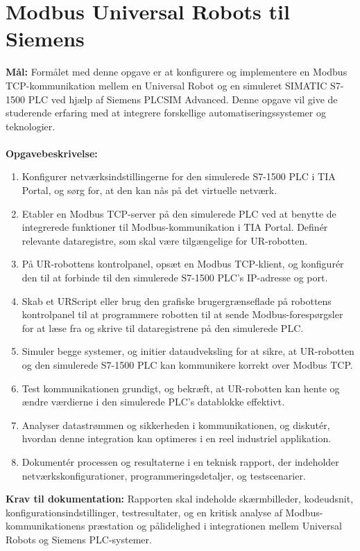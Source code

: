 \section{Modbus Universal Robots til Siemens}
\label{subsec:modbus_tcp_ur_plcsim_advanced}
\textbf{Mål:} Formålet med denne opgave er at konfigurere og implementere en Modbus TCP-kommunikation mellem en Universal Robot og en simuleret SIMATIC S7-1500 PLC ved hjælp af Siemens PLCSIM Advanced. Denne opgave vil give de studerende erfaring med at integrere forskellige automatiseringssystemer og teknologier.	
\\\\
\noindent\textbf{Opgavebeskrivelse:}
\begin{enumerate}
	\item Konfigurer netværksindstillingerne for den simulerede S7-1500 PLC i TIA Portal, og sørg for, at den kan nås på det virtuelle netværk.
	\item Etabler en Modbus TCP-server på den simulerede PLC ved at benytte de integrerede funktioner til Modbus-kommunikation i TIA Portal. Definér relevante dataregistre, som skal være tilgængelige for UR-robotten.
	\item På UR-robottens kontrolpanel, opsæt en Modbus TCP-klient, og konfigurér den til at forbinde til den simulerede S7-1500 PLC's IP-adresse og port.
	\item Skab et URScript eller brug den grafiske brugergrænseflade på robottens kontrolpanel til at programmere robotten til at sende Modbus-forespørgsler for at læse fra og skrive til dataregistrene på den simulerede PLC.
	\item Simuler begge systemer, og initier dataudveksling for at sikre, at UR-robotten og den simulerede S7-1500 PLC kan kommunikere korrekt over Modbus TCP.
	\item Test kommunikationen grundigt, og bekræft, at UR-robotten kan hente og ændre værdierne i den simulerede PLC's datablokke effektivt.
	\item Analyser datastrømmen og sikkerheden i kommunikationen, og diskutér, hvordan denne integration kan optimeres i en reel industriel applikation.
	\item Dokumentér processen og resultaterne i en teknisk rapport, der indeholder netværkskonfigurationer, programmeringsdetaljer, og testscenarier.
\end{enumerate}	
\textbf{Krav til dokumentation:} Rapporten skal indeholde skærmbilleder, kodeudsnit, konfigurationsindstillinger, testresultater, og en kritisk analyse af Modbus-kommunikationens præstation og pålidelighed i integrationen mellem Universal Robots og Siemens PLC-systemer.

